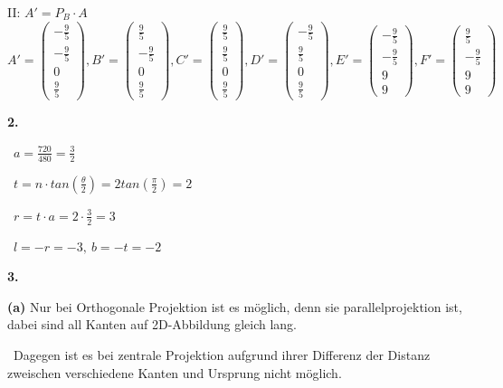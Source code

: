\documentclass[fleqn]{article}
\begin{document}
II: $A' = P_B \cdot A $
$$
A'=
\begin{pmatrix}
    -\frac{9}{5} \\ -\frac{9}{5} \\ 0 \\ \frac{9}{5}    
\end{pmatrix},
B'=
\begin{pmatrix}
    \frac{9}{5} \\ -\frac{9}{5} \\ 0 \\ \frac{9}{5}    
\end{pmatrix},
C'=
\begin{pmatrix}
    \frac{9}{5} \\ \frac{9}{5} \\ 0 \\ \frac{9}{5}    
\end{pmatrix},
D'=
\begin{pmatrix}
    -\frac{9}{5} \\ \frac{9}{5} \\ 0 \\ \frac{9}{5}    
\end{pmatrix},
E'=
\begin{pmatrix}
    -\frac{9}{5} \\ -\frac{9}{5} \\ 9 \\ 9    
\end{pmatrix},
F'=
\begin{pmatrix}
    \frac{9}{5} \\ -\frac{9}{5} \\ 9 \\ 9    
\end{pmatrix}
$$

\indent\textbf{2.}

\quad \  $a = \frac{720}{480} = \frac{3}{2}$

\quad \  $t = n \cdot tan(\frac{\theta}{2}) = 2tan(\frac{\pi}{2}) = 2$

\quad \  $r = t \cdot a = 2 \cdot \frac{3}{2} = 3$

\quad \  $l = -r = -3, \ b = -t = -2$


\indent\textbf{3.}

\indent\indent\textbf{(a)} Nur bei Orthogonale Projektion ist es möglich, denn sie parallelprojektion ist, dabei sind all Kanten auf 2D-Abbildung gleich lang.

\indent\indent\, Dagegen ist es bei zentrale Projektion aufgrund ihrer Differenz der Distanz zweischen verschiedene Kanten und Ursprung nicht möglich.
\end{document}
